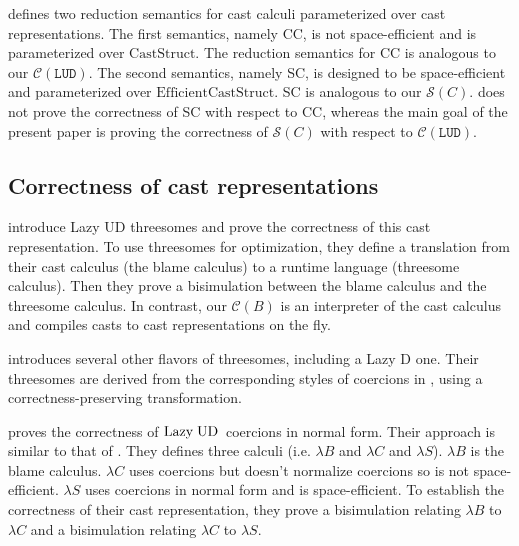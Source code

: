 \documentclass[runningheads]{llncs}
\newcommand{\LUD}{\ensuremath{\text{Lazy\;UD}}}
\newcommand{\CMachine}[1]{\ensuremath{\mathcal{C}(#1)}}
\newcommand{\LUDMachine}{\CMachine{\BLUD}}
\newcommand{\SMachine}[1]{\ensuremath{\mathcal{S}(#1)}}
\newcommand{\BLUD}[0]{\ensuremath{\mathtt{LUD}}}
\begin{document}
\citet{siek2020mechanized} defines two reduction semantics for cast
calculi parameterized over cast representations. The first semantics,
namely CC, is not space-efficient and is parameterized over
$\mathrm{CastStruct}$.  The reduction semantics for CC is analogous to
our \LUDMachine.  The second semantics, namely SC, is designed to be
space-efficient and parameterized over
$\mathrm{EfficientCastStruct}$. SC is analogous to our \SMachine{C}.
\citet{siek2020mechanized} does not prove the correctness of SC with
respect to CC, whereas the main goal of the present paper is proving
the correctness of \SMachine{C} with respect to \LUDMachine.


\subsection{Correctness of cast representations}
\label{subsec:related-work-other-proofs}

\citet{Siek:2010:TWB:1706299.1706342} introduce Lazy UD threesomes and
prove the correctness of this cast representation. To use threesomes for
optimization, they define a translation from their cast calculus
(the blame calculus) to a runtime language (threesome calculus).
Then they prove a bisimulation between the blame calculus
and the threesome calculus.
In contrast, our \CMachine{B} is an interpreter of the cast calculus and 
compiles casts to cast representations on the fly.

\citet{Garcia:2013:CTB:2500365.2500603}
introduces several other flavors of threesomes, including a Lazy D
one. Their threesomes are derived from the corresponding styles of
coercions in \citet{herman2010space}, using a correctness-preserving
transformation.

\cite{Siek:2015:BCT:2737924.2737968} proves the correctness
of \LUD\ coercions in normal form. Their approach is similar to
that of \citet{Siek:2010:TWB:1706299.1706342}. They defines
three calculi (i.e. $\lambda B$ and $\lambda C$ and $\lambda S$). 
$\lambda B$ is the blame calculus. 
$\lambda C$ uses coercions but doesn't normalize coercions
so is not space-efficient. $\lambda S$ uses coercions in normal form
and is space-efficient. To establish the correctness of
their cast representation,
they prove a bisimulation relating $\lambda B$ to $\lambda C$
and a bisimulation relating $\lambda C$ to $\lambda S$.
\end{document}
